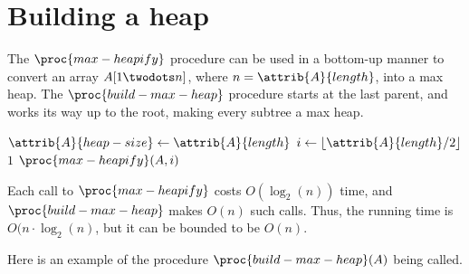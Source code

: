 \documentclass[12pt]{article}
\begin{document}
\newpage

\section*{Building a heap}
The $\proc{max-heapify}$ procedure can be used in a bottom-up manner to convert an array $A[1 \twodots n]$, where $n = \attrib{A}{length}$, into a max heap. The $\proc{build-max-heap}$ procedure starts at the last parent, and works its way up to the root, making every subtree a max heap.

\begin{codebox}
\li $\attrib{A}{heap-size} \gets \attrib{A}{length}$ 
\li \For $i \gets \lfloor \attrib{A}{length}/2 \rfloor$ \Downto $1$
\li \Do
        $\proc{max-heapify}(A, i)$
    \End
\end{codebox}

Each call to $\proc{max-heapify}$ costs $O(\log_2(n))$ time, and $\proc{build-max-heap}$ makes $O(n)$ such calls. Thus, the running time is $O(n \cdot \log_2{(n)}$, but it can be bounded to be $O(n)$.

\newpage

Here is an example of the procedure $\proc{build-max-heap}(A)$ being called.
\end{document}
